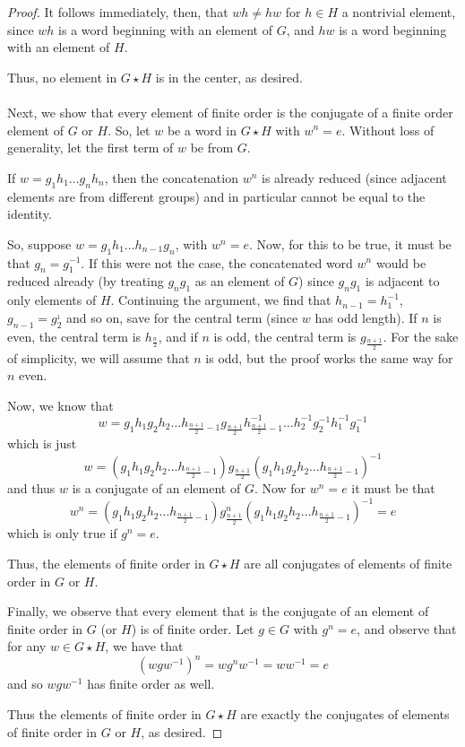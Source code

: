 \documentclass[fontsize=11pt]{scrartcl} %
\numberwithin{equation}{section} %
\numberwithin{figure}{section} %
\numberwithin{table}{section} %
\begin{document}
\begin{proof}
    It follows immediately, then, that $wh\neq hw$ for $h\in H$ a nontrivial
    element, since $wh$ is a word beginning with an element of $G$, and $hw$ is
    a word beginning with an element of $H$.

    Thus, no element in $G\star H$ is in the center, as desired.
    \\
    \\
    Next, we show that every element of finite order is the conjugate of a
    finite order element of $G$ or $H$. So, let $w$ be a word in $G\star H$ with
    $w^n = e$. Without loss of generality, let the first term of $w$ be from
    $G$.

    If $w = g_1h_1\dots g_nh_n$, then the concatenation $w^n$ is already reduced
    (since adjacent elements are from different groups) and in particular cannot
    be equal to the identity.

    So, suppose $w = g_1h_1\dots h_{n-1}g_{n}$, with $w^n = e$. Now, for this to
    be true, it must be that $g_n=g_1^{-1}$. If this were not the case, the
    concatenated word $w^n$ would be reduced already (by treating $g_ng_1$ as an
    element of $G$) since $g_ng_1$ is adjacent to only elements of $H$.
    Continuing the argument, we find that $h_{n-1} = h_1^{-1}$,
    $g_{n-1}=g_2^{_1}$ and so on, save for the central term (since $w$ has odd
    length). If $n$ is even, the central term is $h_{\frac{n}{2}}$, and if $n$
    is odd, the central term is $g_{\frac{n+1}{2}}$. For the sake of simplicity,
    we will assume that $n$ is odd, but the proof works the same way for $n$
    even.

    Now, we know that
    \[
        w = g_1h_1g_2h_2\dots h_{\frac{n+1}{2}-1}
        g_{\frac{n+1}{2}}h_{\frac{n+1}{2}-1}^{-1}\dots h_2^{-1}g_2^{-1}h_1^{-1}g_1^{-1}
    \]
    which is just
    \[
        w= (g_1h_1g_2h_2\dots
        h_{\frac{n+1}{2}-1})g_{\frac{n+1}{2}}(g_1h_1g_2h_2\dots
        h_{\frac{n+1}{2}-1})^{-1}
    \]
    and thus $w$ is a conjugate of an element of $G$. Now for $w^n = e$ it must
    be that 
    \[
        w^n = 
        (g_1h_1g_2h_2\dots
        h_{\frac{n+1}{2}-1})g^n_{\frac{n+1}{2}}(g_1h_1g_2h_2\dots
        h_{\frac{n+1}{2}-1})^{-1} = e
    \]
    which is only true if $g^n = e$.

    Thus, the elements of finite order in $G\star H$ are all conjugates of
    elements of finite order in $G$ or $H$.

    Finally, we observe that every element that is the conjugate of an element
    of finite order in $G$ (or $H$) is of finite order. Let $g\in G$ with $g^n =
    e$, and observe that for any $w\in G\star H$, we have that
    \[
        (wgw^{-1})^n = wg^nw^{-1} = ww^{-1} = e
    \]
    and so $wgw^{-1}$ has finite order as well.

    Thus the elements of finite order in $G\star H$ are exactly the conjugates
    of elements of finite order in $G$ or $H$, as desired.
\end{proof}
\end{document}
